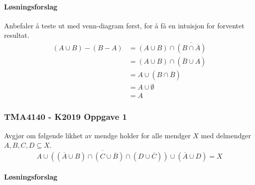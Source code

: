 \paragraph*{Løsningsforslag}
Anbefaler å teste ut med venn-diagram først, for å få en intuisjon for forventet resultat.
\begin{align*}
    (A\cup B)-(B-A) &= (A\cup B)\cap \overline{(B\cap\overline{A})}\\
    &= (A\cup B)\cap (\overline{B}\cup A)\\
    &= A\cup (B\cap \overline{B})\\
    &= A \cup \emptyset\\
    &= A
\end{align*}

\subsubsection{TMA4140 - K2019 Oppgave 1}

Avgjør om følgende likhet av mendge holder for alle mendger $X$ med
delmendger $A,B,C,D \subseteq X$.
\[
\overline{A \cup ((\overline{A} \cup B)\cap (C\cup \overline{B})\cap (D\cup \overline{C}))} \cup (\overline{A} \cup D) = X   
\]

\paragraph*{Løsningsforslag} %